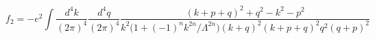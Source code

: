 \begin{equation}\label{F2}
\ f_2 = - e^2 \int \frac{d^4k}{(2\pi)^4}\frac{d^4q}{(2\pi)^4}
\frac{(k+p+q)^2+q^2-k^2-p^2}{k^2\Big(1 + (-1)^n k^{2n}/\Lambda^{2n}\Big)
(k+q)^2 (k+p+q)^2 q^2 (q+p)^2}
\end{equation}

